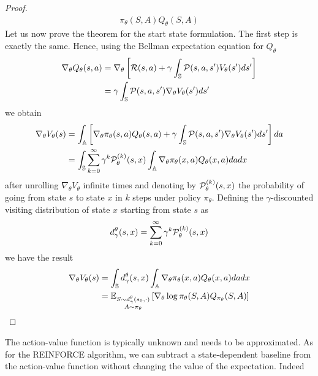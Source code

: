 \begin{proof}
\begin{equation*}
\begin{split}
{				\pi_\theta(S,A) Q_{\theta}(S, A)} 
		\end{split}
	\end{equation*}
	Let us now prove the theorem for the start state formulation. The first step is exactly the same. Hence, using the Bellman expectation equation for $Q_\theta$ 
	\begin{equation*}
		\begin{split}
			\nabla_\theta Q_\theta(s,a) &= \nabla_\theta \left[ \calR(s,a) + \gamma \int_{\S} \calP(s,a,s') V_\theta(s') ds' \right]\\ 
			&= \gamma \int_{\S} \calP(s,a,s') \nabla_\theta V_\theta(s') ds'
		\end{split}
	\end{equation*}
	we obtain
	\begin{equation*}
		\begin{split}
			\nabla_\theta V_\theta(s) &= \int_{\A} \left[ \nabla_\theta \pi_\theta(s,a) Q_\theta(s,a) + \gamma \int_{\S} \calP(s,a,s') \nabla_\theta V_\theta(s') ds' \right] da\\
			&= \int_\S  \sum_{k=0}^{\infty} \gamma^k \calP_\theta^{(k)}(s, x) \int_{\A} \nabla_\theta \pi_\theta(x,a) Q_\theta(x,a) da dx 
		\end{split}
	\end{equation*} 
	after unrolling $\nabla_\theta V_\theta$ infinite times and denoting by $\calP_\theta^{(k)}(s, x)$ the probability of going from state $s$ to state $x$ in $k$ steps under policy $\pi_\theta$.
	Defining the $\gamma$-discounted visiting distribution of state $x$ starting from state $s$ as
	\begin{equation*}
		d_\gamma^\theta(s, x) = \sum_{k=0}^{\infty} \gamma^k \calP_\theta^{(k)}(s, x)
	\end{equation*}
	we have the result
	\begin{equation*}
		\begin{split}
			\nabla_\theta V_\theta(s) &= \int_\S d_\gamma^\theta(s, x) \int_{\A} \nabla_\theta \pi_\theta(x,a) Q_\theta(x,a) da dx\\
			&= \E[\substack{S \sim d_\gamma^\theta(s_0, \cdot)\\A \sim \pi_\theta}]{\nabla_\theta\log \pi_\theta(S,A) Q_{\pi_\theta}(S, A)}
		\end{split}
	\end{equation*} 
\end{proof}
The action-value function is typically unknown and needs to be approximated. 
As for the REINFORCE algorithm, we can subtract a state-dependent baseline from the action-value function without changing the value of the expectation. Indeed 
